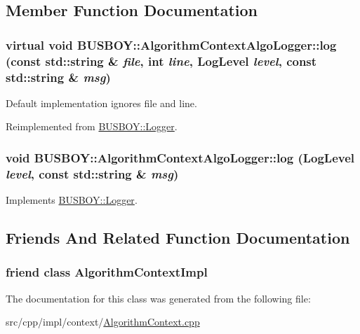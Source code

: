 \subsection{Member Function Documentation}
\hypertarget{classBUSBOY_1_1AlgorithmContextAlgoLogger_a9ab10c3c0978fda39e71bf89abb63c32}{
\subsubsection[{log}]{\setlength{\rightskip}{0pt plus 5cm}virtual void BUSBOY::AlgorithmContextAlgoLogger::log (const std::string \& {\em file}, \/  int {\em line}, \/  {\bf LogLevel} {\em level}, \/  const std::string \& {\em msg})}}
\label{classBUSBOY_1_1AlgorithmContextAlgoLogger_a9ab10c3c0978fda39e71bf89abb63c32}


Default implementation ignores file and line. 

Reimplemented from \hyperlink{classBUSBOY_1_1Logger_a7eec0eff91908006defd671e915ee221}{BUSBOY::Logger}.\hypertarget{classBUSBOY_1_1AlgorithmContextAlgoLogger_aec09b54bdae94b073e215ca5bab0a081}{
\subsubsection[{log}]{\setlength{\rightskip}{0pt plus 5cm}void BUSBOY::AlgorithmContextAlgoLogger::log ({\bf LogLevel} {\em level}, \/  const std::string \& {\em msg})}}
\label{classBUSBOY_1_1AlgorithmContextAlgoLogger_aec09b54bdae94b073e215ca5bab0a081}


Implements \hyperlink{classBUSBOY_1_1Logger_ad07e2e8263d8bfb1e702e0548e502957}{BUSBOY::Logger}.

\subsection{Friends And Related Function Documentation}
\hypertarget{classBUSBOY_1_1AlgorithmContextAlgoLogger_a8f92c5456e2dd462f5c59bd25b0bf9da}{
\subsubsection[{AlgorithmContextImpl}]{\setlength{\rightskip}{0pt plus 5cm}friend class {\bf AlgorithmContextImpl}}}
\label{classBUSBOY_1_1AlgorithmContextAlgoLogger_a8f92c5456e2dd462f5c59bd25b0bf9da}


The documentation for this class was generated from the following file:\begin{DoxyCompactItemize}
\item 
src/cpp/impl/context/\hyperlink{AlgorithmContext_8cpp}{AlgorithmContext.cpp}\end{DoxyCompactItemize}
